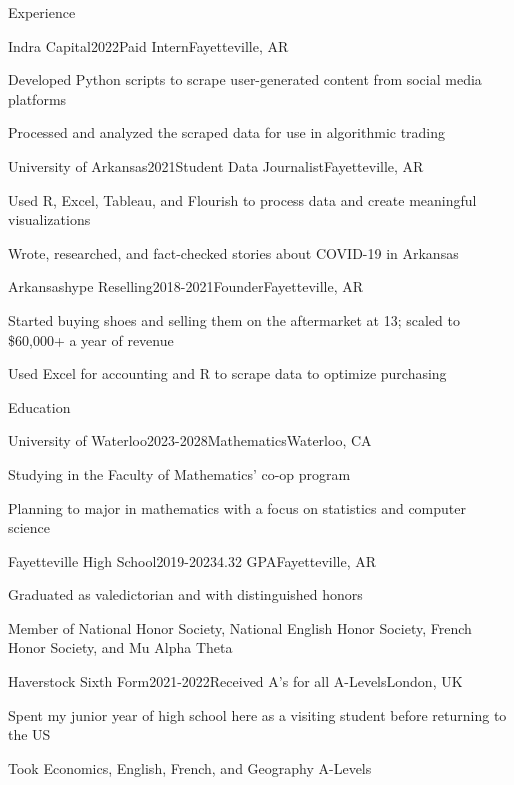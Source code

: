 \documentclass{resume}
\begin{document}
    \begin{rSection}{Experience}
        \begin{rSubsection}{Indra Capital}{2022}{Paid Intern}{Fayetteville, AR}
            \item Developed Python scripts to scrape user-generated content from social media platforms
            \item Processed and analyzed the scraped data for use in algorithmic trading
        \end{rSubsection}
        \begin{rSubsection}{University of Arkansas}{2021}{Student Data Journalist}{Fayetteville, AR}
            \item Used R, Excel, Tableau, and Flourish to process data and create meaningful visualizations
            \item Wrote, researched, and fact-checked stories about COVID-19 in Arkansas
        \end{rSubsection}

        \begin{rSubsection}{Arkansashype Reselling}{2018-2021}{Founder}{Fayetteville, AR}
            \item Started buying shoes and selling them on the aftermarket at 13; scaled to \$60,000+ a year of revenue
            \item Used Excel for accounting and R to scrape data to optimize purchasing
        \end{rSubsection}
    \end{rSection}
    \begin{rSection}{Education}
        \begin{rSubsection}{University of Waterloo}{2023-2028}{Mathematics}{Waterloo, CA}
            \item Studying in the Faculty of Mathematics' co-op program
            \item Planning to major in mathematics with a focus on statistics and computer science
        \end{rSubsection}
        \begin{rSubsection}{Fayetteville High School}{2019-2023}{4.32 GPA}{Fayetteville, AR}
            \item Graduated as valedictorian and with distinguished honors
            \item Member of National Honor Society, National English Honor Society, French Honor Society, and Mu Alpha Theta
        \end{rSubsection}
        \begin{rSubsection}{Haverstock Sixth Form}{2021-2022}{Received A's for all A-Levels}{London, UK}
            \item Spent my junior year of high school here as a visiting student before returning to the US
            \item Took Economics, English, French, and Geography A-Levels
        \end{rSubsection}
    \end{rSection}
\end{document}
